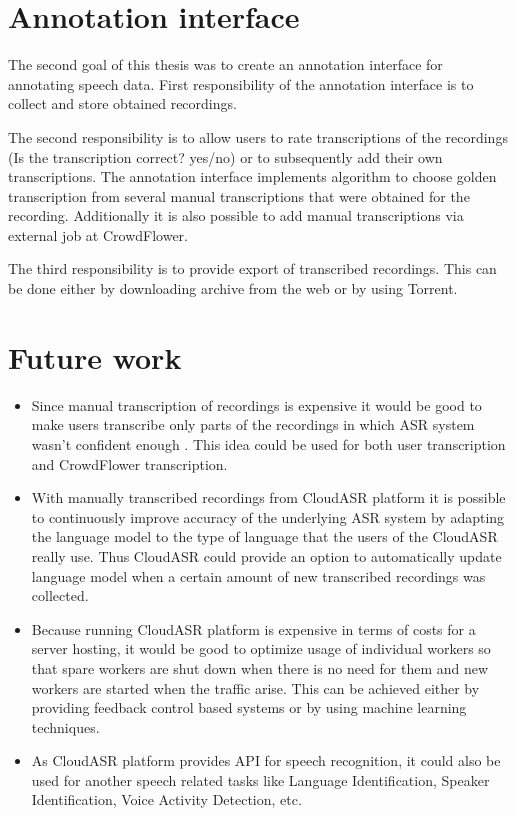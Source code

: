 \section*{Annotation interface}
The second goal of this thesis was to create an annotation interface for annotating speech data.
First responsibility of the annotation interface is to collect and store obtained recordings.

The second responsibility is to allow users to rate transcriptions of the recordings (Is the transcription correct? yes/no) or to subsequently add their own transcriptions.
The annotation interface implements algorithm to choose golden transcription from several manual transcriptions
  that were obtained for the recording.
Additionally it is also possible to add manual transcriptions via external job at CrowdFlower.

The third responsibility is to provide export of transcribed recordings.
This can be done either by downloading archive from the web or by using Torrent.

\section*{Future work}
\begin{itemize}
  \item
    Since manual transcription of recordings is expensive
      it would be good to make users transcribe only parts of the recordings
      in which ASR system wasn't confident enough .
    This idea could be used for both user transcription and CrowdFlower transcription.

  \item
    With manually transcribed recordings from CloudASR platform
      it is possible to continuously improve accuracy of the underlying ASR system
      by adapting the language model to the type of language that the users of the CloudASR really use.
    Thus CloudASR could provide an option to automatically update language model
      when a certain amount of new transcribed recordings was collected.

  \item
    Because running CloudASR platform is expensive in terms of costs for a server hosting,
      it would be good to optimize usage of individual workers
      so that spare workers are shut down when there is no need for them
      and new workers are started when the traffic arise.
    This can be achieved either by providing feedback control based systems 
      or by using machine learning techniques. 

  \item
    As CloudASR platform provides API for speech recognition,
      it could also be used for another speech related tasks like Language Identification, Speaker Identification, Voice Activity Detection, etc.

\end{itemize}


